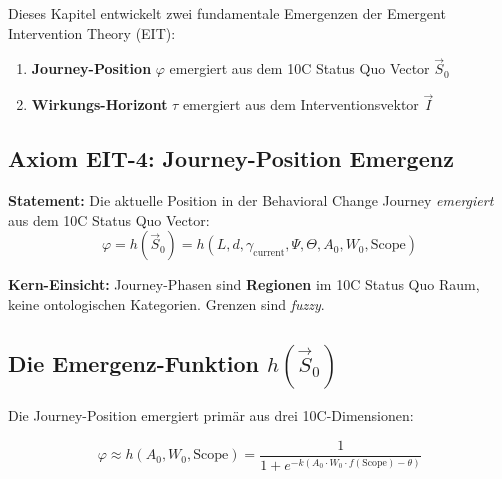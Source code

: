 Dieses Kapitel entwickelt zwei fundamentale Emergenzen der Emergent Intervention Theory (EIT):

\begin{enumerate}
\item \textbf{Journey-Position} $\varphi$ emergiert aus dem 10C Status Quo Vector $\vec{S}_0$
\item \textbf{Wirkungs-Horizont} $\tau$ emergiert aus dem Interventionsvektor $\vec{I}$
\end{enumerate}

\subsection{Axiom EIT-4: Journey-Position Emergenz}

\begin{tcolorbox}[colback=blue!5!white, colframe=blue!75!black,
    title=\textbf{Axiom EIT-4: Journey-Position als emergente Eigenschaft (aus Appendix TKT)}]

\textbf{Statement:} Die aktuelle Position in der Behavioral Change Journey \textit{emergiert} aus dem 10C Status Quo Vector:
\begin{equation}
\boxed{\varphi = h(\vec{S}_0) = h(L, d, \gamma_{\text{current}}, \Psi, \Theta, A_0, W_0, \text{Scope})}
\label{eq:18-journey-emergence}
\end{equation}

\textbf{Kern-Einsicht:} Journey-Phasen sind \textbf{Regionen} im 10C Status Quo Raum, keine ontologischen Kategorien. Grenzen sind \textit{fuzzy}.

\end{tcolorbox}

\subsection{Die Emergenz-Funktion $h(\vec{S}_0)$}

Die Journey-Position emergiert primär aus drei 10C-Dimensionen:

\begin{equation}
\varphi \approx h(A_0, W_0, \text{Scope}) = \frac{1}{1 + e^{-k(A_0 \cdot W_0 \cdot f(\text{Scope}) - \theta)}}
\label{eq:18-emergence-function}
\end{equation}

